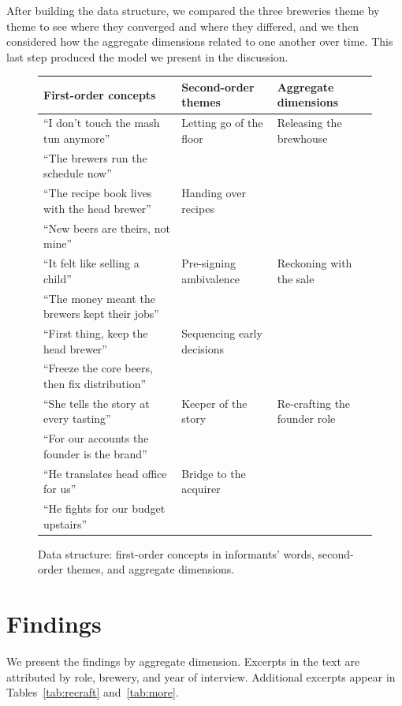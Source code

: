 \documentclass[12pt]{article}
\begin{document}
After building the data structure, we compared the three breweries theme by theme to see where they converged and where they differed, and we then considered how the aggregate dimensions related to one another over time. This last step produced the model we present in the discussion.

\begin{figure}[htbp]
\centering
\small
\renewcommand{\arraystretch}{1.25}
\begin{tabular}{@{}>{\raggedright\arraybackslash}p{6.2cm}>{\raggedright\arraybackslash}p{4.0cm}>{\raggedright\arraybackslash}p{4.4cm}@{}}
\toprule
\textbf{First-order concepts} & \textbf{Second-order themes} & \textbf{Aggregate dimensions}\\
\midrule
``I don't touch the mash tun anymore'' & Letting go of the floor & Releasing the brewhouse\\
``The brewers run the schedule now'' & & \\
``The recipe book lives with the head brewer'' & Handing over recipes & \\
``New beers are theirs, not mine'' & & \\
\midrule
``It felt like selling a child'' & Pre-signing ambivalence & Reckoning with the sale\\
``The money meant the brewers kept their jobs'' & & \\
``First thing, keep the head brewer'' & Sequencing early decisions & \\
``Freeze the core beers, then fix distribution'' & & \\
\midrule
``She tells the story at every tasting'' & Keeper of the story & Re-crafting the founder role\\
``For our accounts the founder is the brand'' & & \\
``He translates head office for us'' & Bridge to the acquirer & \\
``He fights for our budget upstairs'' & & \\
\bottomrule
\end{tabular}
\caption{Data structure: first-order concepts in informants' words, second-order themes, and aggregate dimensions.}
\label{fig:structure}
\end{figure}

\section{Findings}

We present the findings by aggregate dimension. Excerpts in the text are attributed by role, brewery, and year of interview. Additional excerpts appear in Tables~\ref{tab:recraft} and~\ref{tab:more}.
\end{document}
